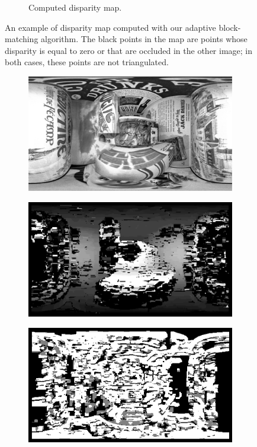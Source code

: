 \begin{figure}[h]
\begin{subfigure}{0.6\linewidth}
		\caption{Computed disparity map.}
	\end{subfigure}
\caption{An example of disparity map computed with our adaptive block-matching
algorithm. The black points in the map are points whose disparity is equal to
zero or that are occluded in the other image; in both cases, these points are
not triangulated.}
\label{fig:llDisparity}
\end{figure}
%
\begin{figure}[h]
\centering
	\begin{subfigure}{0.6\linewidth}
		\centering
		\includegraphics[width=\linewidth]{img/original.png}
	\end{subfigure}
	\begin{subfigure}{0.6\linewidth}
		\centering
		\includegraphics[width=\linewidth]{img/our_disparity.png}
	\end{subfigure}
	\begin{subfigure}{0.6\linewidth}
		\centering
		\includegraphics[width=\linewidth]{img/legacy_disparity.png}

\end{subfigure}
\end{figure}
